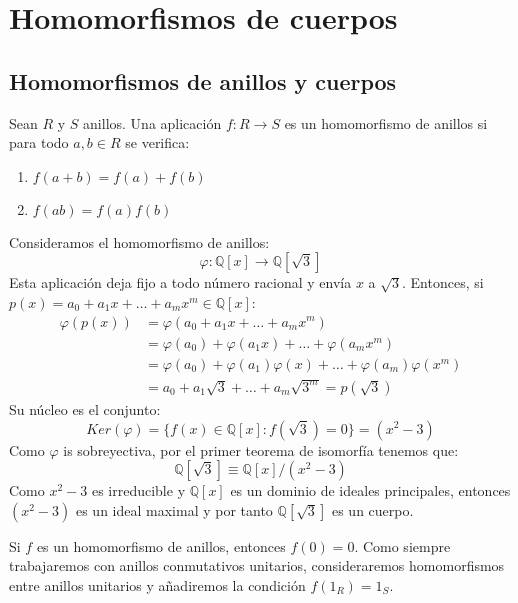 \chapter{Homomorfismos de cuerpos}
\section{Homomorfismos de anillos y cuerpos}

\begin{definition}
    Sean $R$ y $S$ anillos. Una aplicación $f : R \to S$ es un homomorfismo de anillos si para todo $a, b \in R$ se verifica:
    \begin{enumerate}
        \item $f(a + b) = f(a) + f(b)$
        \item $f(ab) = f(a) f(b)$
    \end{enumerate}
\end{definition}

\begin{example}
    Consideramos el homomorfismo de anillos:
    $$\varphi : \mathbb{Q}[x] \to \mathbb{Q}[\sqrt{3}]$$
    Esta aplicación deja fijo a todo número racional y envía $x$ a $\sqrt{3}$.
    Entonces, si $p(x) = a_0 + a_1x + \dots + a_mx^m \in \mathbb{Q}[x]$:
    \begin{align*}
        \varphi(p(x)) & = \varphi(a_0 + a_1x + \dots + a_mx^m)                                     \\
                      & = \varphi(a_0) + \varphi(a_1x) + \dots + \varphi(a_mx^m)                   \\
                      & = \varphi(a_0) + \varphi(a_1)\varphi(x) + \dots + \varphi(a_m)\varphi(x^m) \\
                      & = a_0 + a_1\sqrt{3} + \dots + a_m\sqrt{3^m} = p(\sqrt{3})
    \end{align*}
    Su núcleo es el conjunto:
    $$Ker(\varphi) = \{ f(x) \in \mathbb{Q}[x] : f(\sqrt{3}) = 0 \} = (x^2 - 3)$$
    Como $\varphi$ is sobreyectiva, por el primer teorema de isomorfía tenemos que:
    $$\mathbb{Q}[\sqrt{3}] \equiv \mathbb{Q}[x] / (x^2 - 3)$$
    Como $x^2 - 3$ es irreducible y $\mathbb{Q}[x]$ es un dominio de ideales principales, entonces $(x^2 - 3)$ es un ideal maximal y por tanto $\mathbb{Q}[\sqrt{3}]$ es un cuerpo.
\end{example}

\begin{remark}
    Si $f$ es un homomorfismo de anillos, entonces $f(0) = 0$. Como siempre trabajaremos con anillos conmutativos unitarios, consideraremos homomorfismos entre anillos unitarios y añadiremos la condición $f(1_R) = 1_S$.
\end{remark}

